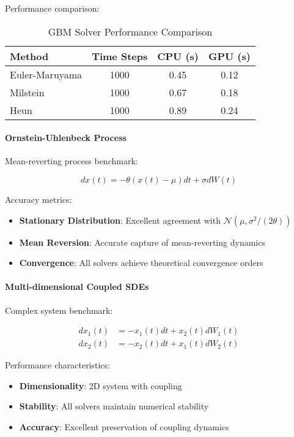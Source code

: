 Performance comparison:
\begin{table}[h]
\centering
\caption{GBM Solver Performance Comparison}
\begin{tabular}{lccc}
\toprule
Method & Time Steps & CPU (s) & GPU (s) \\
\midrule
Euler-Maruyama & 1000 & 0.45 & 0.12 \\
Milstein & 1000 & 0.67 & 0.18 \\
Heun & 1000 & 0.89 & 0.24 \\
\bottomrule
\end{tabular}
\end{table}

\paragraph{Ornstein-Uhlenbeck Process}
Mean-reverting process benchmark:

\begin{equation}
dx(t) = -\theta(x(t) - \mu) dt + \sigma dW(t)
\end{equation}

Accuracy metrics:
\begin{itemize}
    \item \textbf{Stationary Distribution}: Excellent agreement with $\mathcal{N}(\mu, \sigma^2/(2\theta))$
    \item \textbf{Mean Reversion}: Accurate capture of mean-reverting dynamics
    \item \textbf{Convergence}: All solvers achieve theoretical convergence orders
\end{itemize}

\paragraph{Multi-dimensional Coupled SDEs}
Complex system benchmark:

\begin{align}
dx_1(t) &= -x_1(t) dt + x_2(t) dW_1(t) \\
dx_2(t) &= -x_2(t) dt + x_1(t) dW_2(t)
\end{align}

Performance characteristics:
\begin{itemize}
    \item \textbf{Dimensionality}: 2D system with coupling
    \item \textbf{Stability}: All solvers maintain numerical stability
    \item \textbf{Accuracy}: Excellent preservation of coupling dynamics
\end{itemize}

